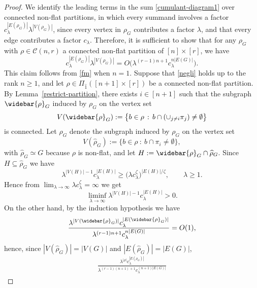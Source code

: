 \documentclass[bj,authoryear,noshowframe]{imsart}
\theoremstyle{plain}
\theoremstyle{remark}
\begin{document}
\begin{proof}
 We identify the leading terms in the sum \eqref{cumulant-diagram1}
 over connected non-flat partitions, in which 
 every summand involves 
 a factor $c_\lambda^{|E(\rho_G)|} \lambda^{|V(\rho_G)|}$,
 since every
 vertex in $\rho_G$ contributes a factor $\lambda$, and that 
 every edge contributes a factor $c_\lambda$.
 Therefore, it is sufficient to show that for any $\rho_G$ 
 with $\rho \in \mathcal{C} (n,r)$
 a connected non-flat partition of $[n]\times[r]$, 
  we have
  \begin{equation}\label{negli}
    c_\lambda^{|E(\rho_G)|} \lambda^{|V(\rho_G)|}
    = O \big(\lambda^{(r-1)n+1}c_\lambda^{n |E(G)|}\big). 
\end{equation}
 This claim follows from \eqref{fm} when $n=1$.
Suppose that \eqref{negli} holds up to the rank $n\ge1$, 
 and let $\rho \in \Pi_{\widehat{1}}( [n+1]\times [r])$ 
 be a connected non-flat partition. 
By Lemma~\ref{restrict-partition}, there exists $i\in[n+1]$ such that
  the subgraph $\widebar{\rho}_G$
  induced by $\rho_G$ on the vertex set
$$
V(\widebar{\rho}_G):=
\big\{
b\in \rho \ \!  : \ \!  b \cap (\cup_{j\ne i}\pi_j) \not= \emptyset
\big\} 
$$
is connected. 
 Let $\widehat{\rho}_G $ 
 denote the subgraph induced by $\rho_G$ on the vertex set
$$
V(\widehat{\rho}_G):=
\big\{
b\in \rho \ \!  : \ \!  b \cap \pi_{i} \not= \emptyset
\big\}, 
$$
with
 $\widehat{\rho}_G\simeq G$
because $\rho$ is non-flat, and let $H:=\widebar{\rho}_G\cap\widehat{\rho}_G$. 
Since $H\subseteq\widehat{\rho}_G$ 
we have  
$$
\lambda^{|V(H)|-1} c_{\lambda}^{|E(H)|} \geq 
\big( \lambda c_{\lambda}^{\zeta }\big)^{|E(H)|/\zeta },
\qquad
\lambda \geq 1. 
$$ 
 Hence from 
$
  \lim_{\lambda \to \infty} 
  \lambda c_\lambda^{\zeta} = \infty$ 
  we get 
  $$
  \liminf_{\lambda \to \infty}
  \lambda^{|V(H)|-1} c_{\lambda}^{|E(H)|} 
  >0. 
  $$ 
 On the other hand, by the induction hypothesis we have 
\begin{equation}
  \frac{\lambda^{|V(\widebar{\rho}_G)|}c_\lambda^{|E(\widebar{\rho}_G)|}}{\lambda^{(r-1)n+1}c_\lambda^{n|E(G)|}} = O(1), 
\end{equation}
hence, since
$|V(\widehat{\rho}_G)| = |V(G)|$
and
$|E(\widehat{\rho}_G)| = |E(G)|$, 
\begin{eqnarray}
  \nonumber
  \frac{\lambda^{|\rho|}c_\lambda^{|E(\rho_G)|}}{\lambda^{(r-1)(n+1)+1}c_\lambda^{(n+1)|E(G)|}}

\end{eqnarray}
\end{proof}
\end{document}
